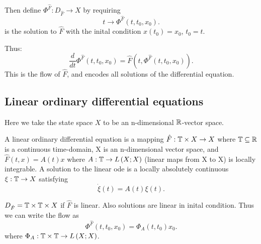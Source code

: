 		Then define $\Phi ^{\hat{F}} : D_{\hat{F}} \to X$ by requiring 
			\[
				t \to \Phi ^{\hat{F}}\left( t, t_{0}, x_0 \right) 
			.\] 
			is the solution to $\hat{F}$ with the inital condition $x\left( t_0 \right)  = x_0$, $t_0 = t$. 

			Thus:
\[
	\frac{d}{dt}\Phi ^{\hat{F}}\left( t, t_0, x_0 \right)  = \hat{F}\left( t, \Phi ^{\hat{F}}\left( t, t_0, x_0 \right)  \right) 
.\] 
This is the flow of $\hat{F}$, and encodes all solutions of the differential equation. 


\subsection{Linear ordinary differential equations}

Here we take the state space $X$ to be an n-dimensional $\mathbb{R}$-vector space. 

\begin{definition}
	A linear ordinary differential equation is a mapping $\hat{F} : \mathbb{T} \times  X \to X$ where $\mathbb{T} \subseteq \mathbb{R} $ is a continuous time-domain, X is an n-dimensional vector space, and $\hat{F}\left( t, x \right) = A\left( t \right) x$ where $A : \mathbb{T} \to L\left( X;X \right) $ (linear maps from X to X) is locally integrable. A solution to the linear ode is a locally absolutely continuous $\xi  : \mathbb{T} \to X$ satisfying 
	\[
		\dot{\xi  } \left( t \right)  = A\left( t \right) \xi  \left( t \right) 
	.\] 
	
\end{definition}
\begin{fact}
	$D_{\hat{F}} = \mathbb{T} \times  \mathbb{T} \times  X$ if $\hat{F}$ is linear. Also solutions are linear in inital condition. Thus we can write the flow as
	\[
		\Phi ^{\hat{F}}\left( t, t_0, x_0 \right)  = \Phi _{A} \left( t, t_0 \right) x_0
	.\] 
	where $\Phi _{A} : \mathbb{T}\times \mathbb{T} \to L\left( X;X \right) $. 
\end{fact}

